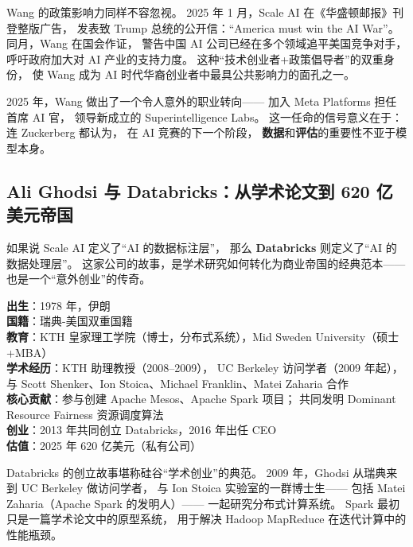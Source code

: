 Wang 的政策影响力同样不容忽视。
2025 年 1 月，Scale AI 在《华盛顿邮报》刊登整版广告，
发表致 Trump 总统的公开信：``America must win the AI War''。
同月，Wang 在国会作证，
警告中国 AI 公司已经在多个领域追平美国竞争对手，
呼吁政府加大对 AI 产业的支持力度。
这种``技术创业者+政策倡导者''的双重身份，
使 Wang 成为 AI 时代华裔创业者中最具公共影响力的面孔之一。

2025 年，Wang 做出了一个令人意外的职业转向——
加入 Meta Platforms 担任首席 AI 官，
领导新成立的 Superintelligence Labs。
这一任命的信号意义在于：
连 Zuckerberg 都认为，
在 AI 竞赛的下一个阶段，
\textbf{数据}和\textbf{评估}的重要性不亚于模型本身。


\subsection{Ali Ghodsi 与 Databricks：从学术论文到 620 亿美元帝国}
\label{subsec:ali-ghodsi}

如果说 Scale AI 定义了``AI 的数据标注层''，
那么 \textbf{Databricks} 则定义了``AI 的数据处理层''。
这家公司的故事，是学术研究如何转化为商业帝国的经典范本——
也是一个``意外创业''的传奇。

\begin{corebox}
\textbf{出生}：1978 年，伊朗\\
\textbf{国籍}：瑞典-美国双重国籍\\
\textbf{教育}：KTH 皇家理工学院（博士，分布式系统），Mid Sweden University（硕士+MBA）\\
\textbf{学术经历}：KTH 助理教授（2008--2009），
UC Berkeley 访问学者（2009 年起），
与 Scott Shenker、Ion Stoica、Michael Franklin、Matei Zaharia 合作\\
\textbf{核心贡献}：参与创建 Apache Mesos、Apache Spark 项目；
共同发明 Dominant Resource Fairness 资源调度算法\\
\textbf{创业}：2013 年共同创立 Databricks，2016 年出任 CEO\\
\textbf{估值}：2025 年 620 亿美元（私有公司）
\end{corebox}

Databricks 的创立故事堪称硅谷``学术创业''的典范。
2009 年，Ghodsi 从瑞典来到 UC Berkeley 做访问学者，
与 Ion Stoica 实验室的一群博士生——
包括 Matei Zaharia（Apache Spark 的发明人）——
一起研究分布式计算系统。
Spark 最初只是一篇学术论文中的原型系统，
用于解决 Hadoop MapReduce 在迭代计算中的性能瓶颈。

